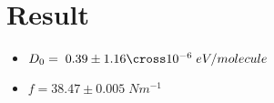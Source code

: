 \section{Result}
    \begin{itemize}
    \item $D_0=\;0.39\pm1.16\cross10^{-6}\;eV/molecule$
    \item $f=38.47\pm0.005\;N m^{-1}$
    \end{itemize}